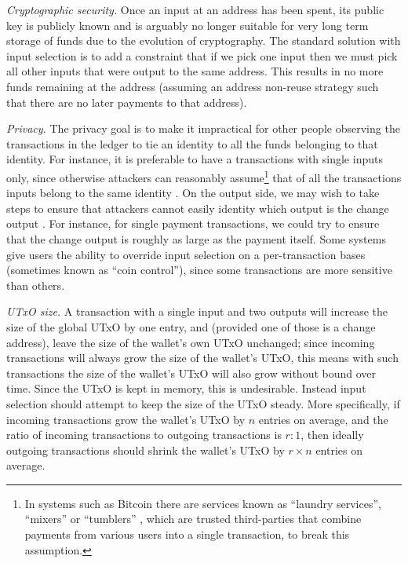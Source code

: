 \documentclass{article}
\theoremstyle{definition}{
  \newtheorem{lemma}{Lemma}[section] %
  \newtheorem{definition}[lemma]{Definition}
}
\theoremstyle{theorem}{
  \newtheorem{invariant}[lemma]{Invariant}
  \newtheorem{proofobligation}[lemma]{Proof Obligation}
}
\numberwithin{equation}{lemma}
\begin{document}
\emph{Cryptographic security.}
Once an input at an address has been spent, its public key is publicly
known and is arguably no longer suitable for very long term storage of funds due
to the evolution of cryptography. The standard solution with input selection is
to add a constraint that if we pick one input then we must pick all other inputs
that were output to the same address. This results in no more funds remaining at
the address (assuming an address non-reuse strategy such that there are no later
payments to that address).

\emph{Privacy.}
The privacy goal is to make it impractical for other people observing the
transactions in the ledger to tie an identity to all the funds belonging to that
identity. For instance, it is preferable to have a transactions with single
inputs only, since otherwise attackers can reasonably assume\footnote{In systems
such as Bitcoin there are services known as ``laundry services'', ``mixers'' or
``tumblers'' \citep{10.1007/978-3-319-70290-2_18}, which are trusted
third-parties that combine payments from various users into a single transaction, to
break this assumption.}  that of all the transactions inputs belong to the same
identity \citep{fergal}. On the output side, we may wish to take steps to ensure
that attackers cannot easily identity which output is the change output
\citep{8260674}. For instance, for single payment transactions, we could try to
ensure that the change output is roughly as large as the payment itself. Some
systems give users the ability to override input selection on a per-transaction
bases (sometimes known as ``coin control''), since some transactions are more
sensitive than others.

\emph{UTxO size.}
A transaction with a single input and two outputs will increase the size of the
global UTxO by one entry, and (provided one of those is a change address), leave
the size of the wallet's own UTxO unchanged; since incoming transactions will
always grow the size of the wallet's UTxO, this means with such transactions the
size of the wallet's UTxO will also grow without bound over time. Since the UTxO
is kept in memory, this is undesirable. Instead input selection should attempt
to keep the size of the UTxO steady. More specifically, if incoming transactions
grow the wallet's UTxO by $n$ entries on average, and the ratio of incoming
transactions to outgoing transactions is $r : 1$, then ideally outgoing
transactions should shrink the wallet's UTxO by $r \times n$ entries on average.
\end{document}
